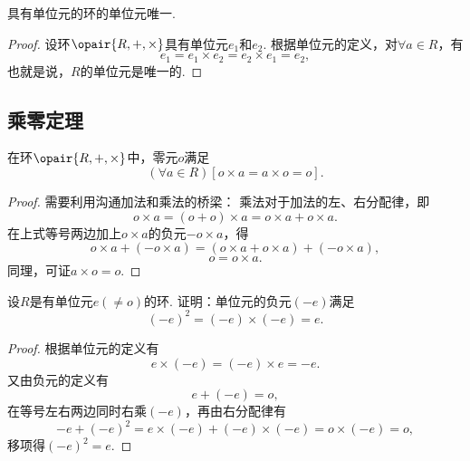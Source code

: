\begin{property}
具有单位元的环的单位元唯一.
\begin{proof}
设环\(\opair{R,+,\times}\)具有单位元\(e_1\)和\(e_2\).
根据单位元的定义，对\(\forall a \in R\)，有\begin{equation*}
	e_1 = e_1 \times e_2 = e_2 \times e_1 = e_2,
\end{equation*}
也就是说，\(R\)的单位元是唯一的.
\end{proof}
\end{property}

\subsection{乘零定理}
\begin{theorem}[乘零定理]
在环\(\opair{R,+,\times}\)中，零元\(o\)满足\begin{equation*}
	(\forall a \in R)[o \times a = a \times o = o].
\end{equation*}
\begin{proof}
需要利用沟通加法和乘法的桥梁：
乘法对于加法的左、右分配律，即\begin{equation*}
	o \times a = (o + o) \times a = o \times a + o \times a.
\end{equation*}在上式等号两边加上\(o \times a\)的负元\(-o \times a\)，得\begin{equation*}
	o \times a + (- o \times a) = (o \times a + o \times a) + (- o \times a),
\end{equation*}\begin{equation*}
	o = o \times a.
\end{equation*}
同理，可证\(a \times o = o\).
\end{proof}
\end{theorem}

\begin{example}
设\(R\)是有单位元\(e(\neq o)\)的环.
证明：单位元的负元\((-e)\)满足\begin{equation*}
	(-e)^2=(-e)\times(-e)=e.
\end{equation*}
\begin{proof}
根据单位元的定义有\begin{equation*}
	e \times (-e) = (-e) \times e = -e.
\end{equation*}
又由负元的定义有\begin{equation*}
	e + (-e) = o,
\end{equation*}
在等号左右两边同时右乘\((-e)\)，再由右分配律有\begin{equation*}
	-e + (-e)^2 = e \times (-e) + (-e) \times (-e) = o \times (-e) = o,
\end{equation*}
移项得\((-e)^2 = e\).
\end{proof}
\end{example}

